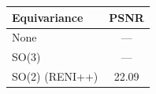 \begin{tabular}{| l | c |}
\hline
Equivariance & PSNR \\
\hline
None & --- \\
SO(3) & --- \\
SO(2) (RENI++) & 22.09 \\
\hline
\end{tabular}
